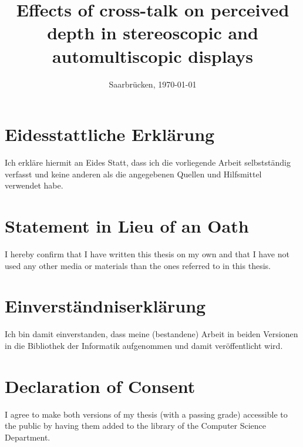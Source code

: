 \documentclass[11pt, a4paper, twoside]{Thesis}
\begin{document}

\frontmatter

\title  {Effects of cross-talk on perceived depth in stereoscopic and automultiscopic displays}

\addresses  {\groupname\\\deptname\\\univname}  %
\date       {Saarbr\"ucken, \today }
\subject    {}
\keywords   {}

\maketitle



\thispagestyle{empty}

\section*{Eidesstattliche Erkl\"{a}rung}
Ich erkl\"{a}re hiermit an Eides Statt, dass ich die vorliegende Arbeit selbstst\"{a}ndig verfasst und keine
anderen als die angegebenen Quellen und Hilfsmittel verwendet habe.

\vspace{0.60cm}
\section*{Statement in Lieu of an Oath}
I hereby confirm that I have written this thesis on my own and that I have not used any other media or
materials than the ones referred to in this thesis.
\vspace{1.5cm}

\section*{Einverst\"{a}ndniserkl\"{a}rung}
Ich bin damit einverstanden, dass meine (bestandene) Arbeit in beiden Versionen in die Bibliothek der
Informatik aufgenommen und damit ver\"{o}ffentlicht wird.

\vspace{0.60cm}
\section*{Declaration of Consent}
I agree to make both versions of my thesis (with a passing grade) accessible to the public by having
them added to the library of the Computer Science Department.
\vspace{3cm}
\end{document}
